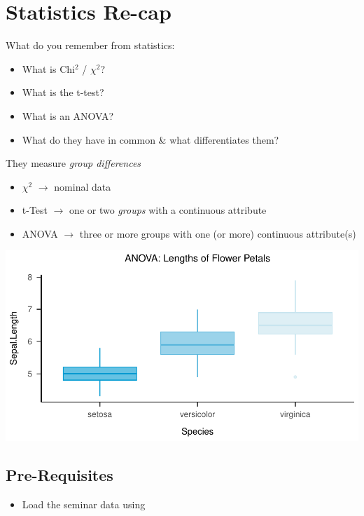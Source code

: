 \documentclass[
]{book}
\providecommand{\tightlist}{%
  \setlength{\itemsep}{0pt}\setlength{\parskip}{0pt}}
\begin{document}
\section{\texorpdfstring{Statistics Re-cap }{Statistics Re-cap }}\label{statistics-re-cap}

What do you remember from statistics:

\begin{itemize}
\tightlist
\item
  What is Chi\(^2\) / \(\chi^2\)?
\item
  What is the t-test?
\item
  What is an ANOVA?
\item
  What do they have in common \& what differentiates them?
\end{itemize}

They measure \emph{group differences}

\begin{itemize}
\tightlist
\item
  \(\chi^2\) \(\rightarrow\) nominal data
\item
  t-Test \(\rightarrow\) one or two \emph{groups} with a continuous attribute
\item
  ANOVA \(\rightarrow\) three or more groups with one (or more) continuous attribute(s)
\end{itemize}

\includegraphics{_main_files/figure-html/unnamed-chunk-58-1.pdf}

\subsection{Pre-Requisites}\label{pre-requisites}

\begin{itemize}
\tightlist
\item
  Load the seminar data using
\end{itemize}
\end{document}
